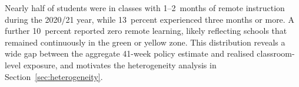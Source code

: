 Nearly half of students were in classes with 1--2~months of remote instruction during
the 2020/21 year, while 13~percent experienced three months or more. A further
10~percent reported zero remote learning, likely reflecting schools that remained
continuously in the green or yellow zone. This distribution reveals a wide gap
between the aggregate 41-week policy estimate and realised classroom-level exposure,
and motivates the heterogeneity analysis in Section~\ref{sec:heterogeneity}.
